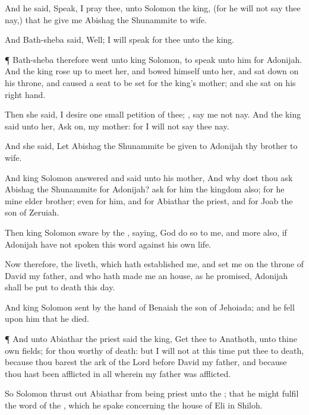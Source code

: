 {And he
said,
Speak, I pray thee, unto
Solomon the
king, (for he will not
say
thee
nay,) that he
give me
Abishag the
Shunammite to
wife.

And
Bath-sheba
said,
Well; I will
speak for thee unto the
king.


\par }{\PP {}¶
Bath-sheba therefore
went unto
king
Solomon, to
speak unto him for
Adonijah. And the
king rose
up to
meet her, and
bowed himself unto her, and sat
down on his
throne, and caused a
seat to be
set for the
king’s
mother; and she
sat on his right
hand.

Then she
said, I
desire
one
small
petition of thee;
{},
say
me not
nay. And the
king
said unto her, Ask
on, my
mother: for I will not
say
thee
nay.

And she
said, Let
Abishag the
Shunammite be
given to
Adonijah thy
brother to
wife.

And
king
Solomon
answered and
said unto his
mother, And why dost thou
ask
Abishag the
Shunammite for
Adonijah?
ask for him the
kingdom also; for he
{} mine
elder
brother; even for him, and for
Abiathar the
priest, and for
Joab the
son of
Zeruiah.

Then
king
Solomon
sware by the
{},
saying,
God
do so to me, and more
also, if
Adonijah have not
spoken this
word against his own
life.

Now therefore,
{} the
{}
liveth, which hath
established me, and
set me on the
throne of
David my
father, and who hath
made me an
house, as he
promised,
Adonijah shall be put to
death this
day.

And
king
Solomon
sent by the
hand of
Benaiah the
son of
Jehoiada; and he
fell upon him that he
died.


\par }{\PP {}¶ And unto
Abiathar the
priest
said the
king,
Get thee to
Anathoth, unto thine own
fields; for thou
{}
worthy of
death: but I will not at this
time put thee to
death, because thou
barest the
ark of the
Lord
{}
before
David my
father, and because thou hast been
afflicted in all wherein my
father was
afflicted.

So
Solomon thrust
out
Abiathar from being
priest unto the
{}; that he might
fulfil the
word of the
{}, which he
spake concerning the
house of
Eli in
Shiloh.


}
